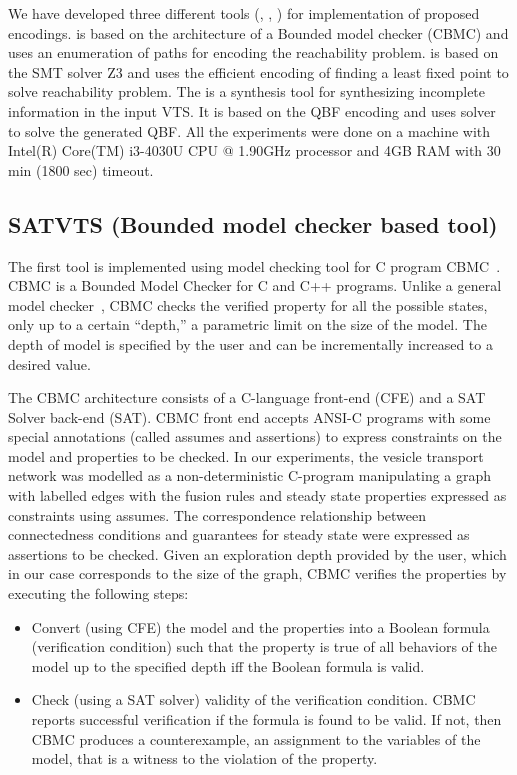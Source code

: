 

We have developed three different tools (\sattool, \smttool, \ourtool) for implementation of proposed encodings. {\sattool} is based on the architecture of a Bounded model checker (CBMC) and uses an enumeration of paths for encoding the reachability problem. {\smttool} is based on the SMT solver Z3 and uses the efficient encoding of finding a least fixed point to solve reachability problem. The {\ourtool} is a synthesis tool for synthesizing incomplete information in the input VTS. It is based on the QBF encoding and uses {\depqbf} solver to solve the generated QBF. All the experiments were done on a machine with Intel(R) Core(TM) i3-4030U CPU @ 1.90GHz processor and 4GB RAM with 30 min (1800 sec) timeout.



%

\subsection{SATVTS (Bounded model checker based tool)} 
The first tool is implemented using model checking tool for C program CBMC~\cite{clarke2004tool}.
%
CBMC is a Bounded Model Checker for C and C++ programs. 
%
Unlike a general model checker~\cite{cimatti2002nusmv}, CBMC checks the verified property for all the possible states, only up to a certain “depth,” a parametric limit on the size of the model.
%
The depth of model is specified by the user and can be  incrementally increased to a desired value.

The CBMC architecture consists of a C-language front-end (CFE) and a SAT Solver back-end (SAT). 
%
CBMC front end accepts ANSI-C programs with some special annotations (called assumes and assertions) to express constraints on the model and properties to be checked. 
%		
In our experiments, the vesicle transport network was modelled as a non-deterministic C-program manipulating a graph with labelled edges with the fusion rules and steady state properties expressed as constraints using assumes. 
%		
The correspondence relationship between connectedness conditions
and guarantees for steady state were expressed as assertions to be checked. 
%		
Given an exploration depth provided by the user, which in our case corresponds to the size of the graph, CBMC verifies the properties by executing the following steps:
	\begin{itemize}
	\item Convert (using CFE) the model and the properties into a Boolean formula (verification condition) such that the property is true of all behaviors of the model up to the specified
depth iff the Boolean formula is valid.
	\item Check (using a SAT solver) validity of the verification condition. CBMC reports successful verification if the formula is found to be valid. If not, then CBMC produces a counterexample,
an assignment to the variables of the model, that is a witness to the violation of the property.
	\end{itemize}

